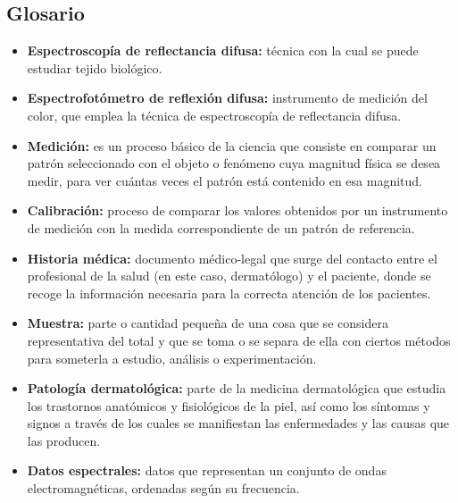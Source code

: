 \subsection{Glosario}

\begin{itemize}
	
	\item \textbf{Espectroscop\'{i}a de reflectancia difusa:}  t\'{e}cnica con la cual se puede estudiar tejido biol\'{o}gico.

	\item \textbf{Espectrofot\'{o}metro de reflexi\'{o}n difusa:} instrumento de medici\'{o}n del color, que emplea la t\'{e}cnica de espectroscop\'{i}a de reflectancia difusa.
	
	\item \textbf{Medici\'{o}n:} es un proceso b\'{a}sico de la ciencia que consiste en comparar un patr\'{o}n seleccionado con el objeto o fen\'{o}meno cuya magnitud f\'{i}sica se desea medir, para ver cu\'{a}ntas veces el patr\'{o}n est\'{a} contenido en esa magnitud.
	
	\item \textbf{Calibraci\'{o}n:} proceso de comparar los valores obtenidos por un instrumento de medici\'{o}n con la medida correspondiente de un patr\'{o}n de referencia.
	
	\item \textbf{Historia m\'{e}dica:} documento m\'{e}dico-legal que surge del contacto entre el profesional de la salud (en este caso, dermat\'{o}logo) y el paciente, donde se recoge la informaci\'{o}n necesaria para la correcta atenci\'{o}n de los pacientes.
	
	\item \textbf{Muestra:} parte o cantidad peque\~{n}a de una cosa que se considera representativa del total y que se toma o se separa de ella con ciertos m\'{e}todos para someterla a estudio, an\'{a}lisis o experimentaci\'{o}n.
	
	\item \textbf{Patolog\'{i}a dermatol\'{o}gica:} parte de la medicina dermatol\'{o}gica que estudia los trastornos anat\'{o}micos y fisiol\'{o}gicos de la piel, as\'{i} como los s\'{i}ntomas y signos a trav\'{e}s de los cuales se manifiestan las enfermedades y las causas que las producen.
	
	\item \textbf{Datos espectrales:} datos que representan un conjunto de ondas electromagn\'{e}ticas, ordenadas seg\'{u}n su frecuencia.
	

\end{itemize}
